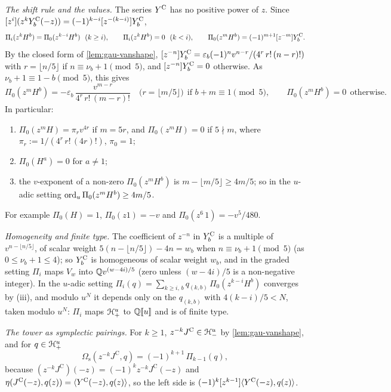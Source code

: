\emph{The shift rule and the values.} The series $Y^{\mathrm{C}}$ has no positive power of $z$. Since $[z^i](z^kY^{\mathrm{C}}_b(-z)) = (-1)^{k-i}[z^{-(k-i)}]Y^{\mathrm{C}}_b$,
\begin{equation}
\label{eq:tra-shift}
\Pi_i(z^kH^b) = \Pi_0(z^{k-i}H^b)\ \ (k\geq i),\qquad \Pi_i(z^kH^b) = 0\ \ (k<i),\qquad \Pi_0(z^mH^b) = (-1)^{m+1}\coef{z^{-m}}\YC_b .
\end{equation}
By the closed form of \cref{lem:gau-vanshape}, $[z^{-n}]Y^{\mathrm{C}}_b = \varepsilon_b(-1)^nv^{n-r}/(4^r\,r!\,(n-r)!)$ with $r = \lfloor n/5\rfloor$ if $n\equiv\nu_b+1\pmod 5$, and $[z^{-n}]Y^{\mathrm{C}}_b = 0$ otherwise. As $\nu_b+1\equiv 1-b\pmod 5$, this gives
\begin{equation}
\label{eq:tra-values}
\Pi_0(z^mH^b) = -\varepsilon_b\,\frac{v^{m-r}}{4^r\,r!\,(m-r)!}\quad\bigl(r = \lfloor m/5\rfloor\bigr)\ \ \text{if } b+m\equiv 1\pmod 5,\qquad \Pi_0(z^mH^b) = 0\ \ \text{otherwise}.
\end{equation}
In particular:
\begin{enumerate}
\item $\Pi_0(z^mH) = \pi_rv^{4r}$ if $m = 5r$, and $\Pi_0(z^mH) = 0$ if $5\nmid m$, where $\pi_r := 1/(4^r\,r!\,(4r)!)$, $\pi_0 = 1$;
\item $\Pi_0(H^a) = 0$ for $a\neq 1$;
\item the $v$-exponent of a non-zero $\Pi_0(z^mH^b)$ is $m-\lfloor m/5\rfloor\geq 4m/5$; so in the $u$-adic setting $\operatorname{ord}_u\Pi_0(z^mH^b)\geq 4m/5$.
\end{enumerate}
For example $\Pi_0(H) = 1$, $\Pi_0(z1) = -v$ and $\Pi_0(z^6\,1) = -v^5/480$.

\emph{Homogeneity and finite type.} The coefficient of $z^{-n}$ in $Y^{\mathrm{C}}_b$ is a multiple of $v^{n-\lfloor n/5\rfloor}$, of scalar weight $5(n-\lfloor n/5\rfloor)-4n = w_b$ when $n\equiv\nu_b+1\pmod 5$ (as $0\leq\nu_b+1\leq 4$); so $Y^{\mathrm{C}}_b$ is homogeneous of scalar weight $w_b$, and in the graded setting $\Pi_i$ maps $V_w$ into $\mathbb{Q} v^{(w-4i)/5}$ (zero unless $(w-4i)/5$ is a non-negative integer). In the $u$-adic setting $\Pi_i(q) = \sum_{k\geq i,\,b}q_{(k,b)}\,\Pi_0(z^{k-i}H^b)$ converges by (iii), and modulo $u^N$ it depends only on the $q_{(k,b)}$ with $4(k-i)/5<N$, taken modulo $u^N$: $\Pi_i$ maps $\mathcal{H}^u_+$ to $\mathbb{Q}[\![ u ]\!]$ and is of finite type.

\emph{The tower as symplectic pairings.} For $k\geq 1$, $z^{-k}J^{\mathrm C}\in\mathcal{H}^u_-$ by \cref{lem:gau-vanshape}, and for $q\in\mathcal{H}^u_+$
\begin{equation}
\label{eq:tra-pairing}
\Omega_{\mathrm s}(z^{-k}J^{\mathrm C},q) = (-1)^{k+1}\,\Pi_{k-1}(q),
\end{equation}
because $(z^{-k}J^{\mathrm C})(-z) = (-1)^kz^{-k}J^{\mathrm C}(-z)$ and $\eta(J^{\mathrm C}(-z),q(z)) = \langle Y^{\mathrm{C}}(-z),q(z)\rangle$, so the left side is $(-1)^k[z^{k-1}]\langle Y^{\mathrm{C}}(-z),q(z)\rangle$.

